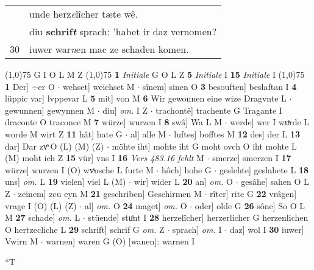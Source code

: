\documentclass[8pt,a4paper,notitlepage]{article}
\begin{document}
\begin{table}[ht]
\begin{minipage}[t]{0.5\linewidth}
\begin{tabular}{rl}
 & unde herz\textit{e}lîcher tæte wê.\\ 
 & diu \textbf{schrif\textit{t}} sprach: 'habet ir daz vernomen?\\ 
30 & iuwer war\textit{n}en mac ze schaden komen.\\ 
\end{tabular}
\scriptsize
\line(1,0){75} \newline
G I O L M Z \newline
\line(1,0){75} \newline
\textbf{1} \textit{Initiale} G O L Z  \textbf{5} \textit{Initiale} I  \textbf{15} \textit{Initiale} I  \newline
\line(1,0){75} \newline
\textbf{1} Der] ÷er O  $\cdot$ wehset] weichset M  $\cdot$ sînem] sinen O \textbf{3} besouften] beslaftan I \textbf{4} lüppic var] lvppevar L \textbf{5} mit] von M \textbf{6} Wir gewonnen eine wize Dragvnte L  $\cdot$ gewunnen] gewynnen M  $\cdot$ diu] \textit{om.} I Z  $\cdot$ trachontê] trachente G Tragante I draconte O traconce M \textbf{7} würze] wurzen I \textbf{8} swâ] Wa L M  $\cdot$ werde] wer I wuͯrde L worde M wirt Z \textbf{11} hât] hate G  $\cdot$ al] alle M  $\cdot$ luftes] bofftes M \textbf{12} des] der L \textbf{13} dar] Dar zvͦ O (L) (M) (Z)  $\cdot$ möhte iht] mohte iht G moht ovch O iht mohte L (M) moht ich Z \textbf{15} vür] vns I \textbf{16} \textit{Vers 483.16 fehlt} M   $\cdot$ smerze] smerzen I \textbf{17} würze] wurzen I (O) wvͯnsche L furte M  $\cdot$ hôch] hohe G  $\cdot$ geslehte] geslahete L \textbf{18} uns] \textit{om.} L \textbf{19} vielen] viel L (M)  $\cdot$ wir] wider L \textbf{20} an] \textit{om.} O  $\cdot$ gesâhe] sahen O L Z  $\cdot$ zeinem] zcu eyn M \textbf{21} geschriben] Geschirmen M  $\cdot$ rîter] rite G \textbf{22} vrâgen] vrage I (O) (L) (Z)  $\cdot$ al] \textit{om.} O \textbf{24} maget] \textit{om.} O  $\cdot$ oder] olde G \textbf{26} sône] So O L M \textbf{27} schade] \textit{om.} L  $\cdot$ stüende] stuͤnt I \textbf{28} herzelîcher] herzerlicher G herzenlichen O hertzecliche L \textbf{29} schrift] schrif G \textit{om.} Z  $\cdot$ sprach] \textit{om.} I  $\cdot$ daz] wol I \textbf{30} iuwer] Vwirn M  $\cdot$ warnen] waren G (O) [wanen]: warnen  I \newline
\end{minipage}
\hspace{0.5cm}
\begin{minipage}[t]{0.5\linewidth}
\small
\begin{center}*T
\end{center}

\end{minipage}
\end{table}
\end{document}
